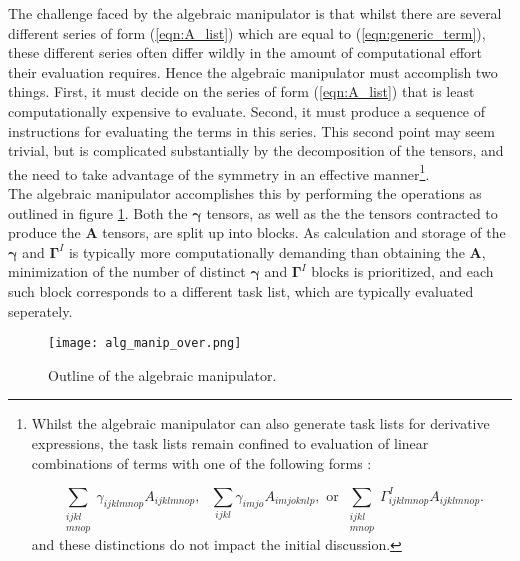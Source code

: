 \noindent The challenge faced by the algebraic manipulator is that whilst there are several different
series of form (\ref{eqn:A_list}) which are equal to (\ref{eqn:generic_term}), these different series 
often differ wildly in the amount of computational effort their evaluation requires. Hence the algebraic manipulator must
accomplish two things. First, it must decide on the series of form (\ref{eqn:A_list}) that is
least computationally expensive to
evaluate. Second, it must produce a sequence of instructions for evaluating the terms in this series.
This second point may seem trivial, but is complicated substantially by the decomposition of the tensors, and the need to take advantage of the symmetry in 
an effective manner\footnote{Whilst
the algebraic manipulator can also generate task lists for derivative expressions, the task lists remain 
confined to evaluation of linear combinations of terms with one of the following forms : 

\begin{equation}
\sum_{\substack{ijkl \\ mnop} }\gamma_{ijklmnop} A_{ijklmnop},
\text{ \ \ \ \ \ \ \ \ }
\sum_{ijkl}\gamma_{imjo} A_{imjoknlp},
\text{ \ \ \ \ or  \ \ \ \ }
\sum_{\substack{ijkl \\ mnop}}\Gamma^{I}_{ijklmnop} A_{ijklmnop}.
\label{eqn:kinds_of_terms}
\end{equation}
\noindent and these distinctions do not impact the initial discussion.}.\\

\noindent The algebraic manipulator accomplishes this by performing the operations as outlined in figure
\ref{fig:alg_manip_overview}. Both the $\mathbf{\gamma}$ tensors, as well as the
the tensors contracted to produce the $\mathbf{A}$ tensors, are split up into blocks. 
As calculation and storage of the $\mathbf{\gamma}$ and $\mathbf{\Gamma}^{I}$ is typically more
computationally demanding than obtaining the $\mathbf{A}$, minimization of the
number of distinct $\mathbf{\gamma}$ and $\mathbf{\Gamma}^{I}$ blocks
is prioritized, and each such block corresponds to a different task list, which
are typically evaluated seperately. \\

\begin{figure}[!ht]
\begin{center}
\texttt{[image: alg\_manip\_over.png]}
\caption{ Outline of the algebraic manipulator. }
\label{fig:alg_manip_overview}
\end{center}
\end{figure}

